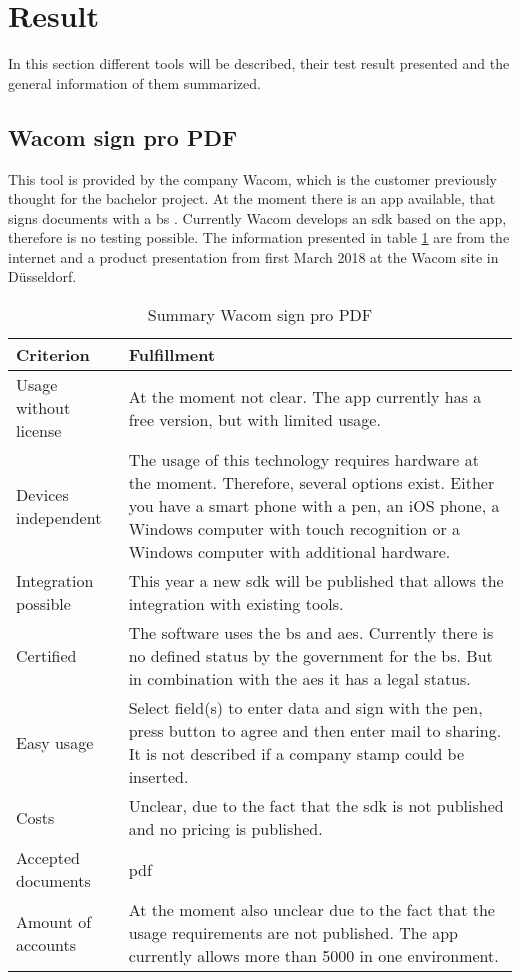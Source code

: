 \section{Result}
In this section different tools will be described, their test result presented and the general information of them summarized.

\subsection{Wacom sign pro PDF}
This tool is provided by the company Wacom, which is the customer previously thought for the bachelor project. At the moment there is an \gls{app} available, that signs documents with a \gls{bs} \parencite{wacom2018pdf}. Currently Wacom develops an \gls{sdk} based on the \gls{app}, therefore is no testing possible. The information presented in table \ref{tab:wacom} are from the internet and a product presentation from first March 2018 at the Wacom site in Düsseldorf. 
\begin{table}[h]
	\begin{tabular}{|p{4cm}|p{10cm}|} \hline
		Criterion & Fulfillment \\ \hline
		Usage without license & At the moment not clear. The \gls{app} currently has a free version, but with limited usage.\\ \hline
		Devices independent & The usage of this technology requires hardware at the moment. Therefore, several options exist. Either you have a smart phone with a pen, an iOS phone, a Windows computer with touch recognition or a Windows computer with additional hardware.\\ \hline
		Integration possible & This year a new \gls{sdk} will be published that allows the integration with existing tools. \\ \hline
		Certified & The software uses the \gls{bs} and \gls{aes}. Currently there is no defined status by the government for the \gls{bs}. But in combination with the \gls{aes} it has a legal status. \\ \hline
		Easy usage & Select field(s) to enter data and sign with the pen, press button to agree and then enter mail to sharing. It is not described if a company stamp could be inserted.\\ \hline
		Costs & Unclear, due to the fact that the \gls{sdk} is not published and no pricing is published.\\ \hline
		Accepted documents & \Gls{pdf}\\ \hline
		Amount of accounts & At the moment also unclear due to the fact that the usage requirements are not published. The \gls{app} currently allows more than 5000 in one environment. \\ \hline
	\end{tabular}
	\caption{Summary Wacom sign pro PDF}
	\label{tab:wacom}
\end{table}

